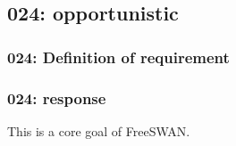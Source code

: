 \subsection{024: opportunistic}

\subsubsection{024: Definition of requirement }

\subsubsection{024: response}

This is a core goal of FreeSWAN.


